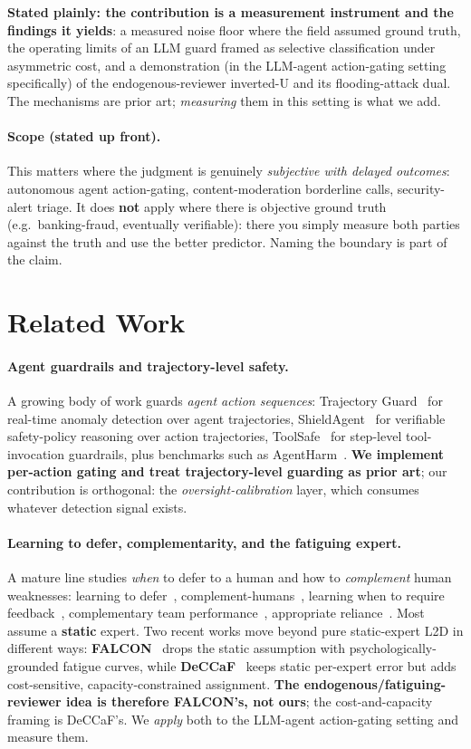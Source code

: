 \documentclass[11pt]{article}
\begin{document}
\noindent \textbf{Stated plainly: the contribution is a measurement instrument and the findings it
yields}: a measured noise floor where the field assumed ground truth, the operating limits of an
LLM guard framed as selective classification under asymmetric cost, and a demonstration (in the
LLM-agent action-gating setting specifically) of the endogenous-reviewer inverted-U and its
flooding-attack dual. The mechanisms are prior art; \emph{measuring} them in this setting is what we
add.

\paragraph{Scope (stated up front).} This matters where the judgment is genuinely \emph{subjective
with delayed outcomes}: autonomous agent action-gating, content-moderation borderline calls,
security-alert triage. It does \textbf{not} apply where there is objective ground truth (e.g.\
banking-fraud, eventually verifiable): there you simply measure both parties against the truth and
use the better predictor. Naming the boundary is part of the claim.

\section{Related Work}

\paragraph{Agent guardrails and trajectory-level safety.} A growing body of work guards \emph{agent
action sequences}: Trajectory Guard~\cite{traj-guard} for real-time anomaly detection over agent
trajectories, ShieldAgent~\cite{shieldagent} for verifiable safety-policy reasoning over action
trajectories, ToolSafe~\cite{toolsafe} for step-level tool-invocation guardrails, plus benchmarks
such as AgentHarm~\cite{agentharm}. \textbf{We implement per-action gating and treat trajectory-level
guarding as prior art}; our contribution is orthogonal: the \emph{oversight-calibration} layer,
which consumes whatever detection signal exists.

\paragraph{Learning to defer, complementarity, and the fatiguing expert.} A mature line studies
\emph{when} to defer to a human and how to \emph{complement} human weaknesses: learning to
defer~\cite{madras18}, complement-humans~\cite{charusaie22}, learning when to require
feedback~\cite{pugnana25}, complementary team performance~\cite{hemmer24}, appropriate
reliance~\cite{schemmer23}. Most assume a \textbf{static} expert. Two recent works move beyond pure static-expert L2D in
different ways: \textbf{FALCON}~\cite{falcon} drops the static assumption with
psychologically-grounded fatigue curves, while \textbf{DeCCaF}~\cite{deccaf} keeps static per-expert
error but adds cost-sensitive, capacity-constrained assignment. \textbf{The endogenous/fatiguing-reviewer
idea is therefore FALCON's, not ours}; the cost-and-capacity framing is DeCCaF's. We \emph{apply} both
to the LLM-agent action-gating setting and measure them.
\end{document}
